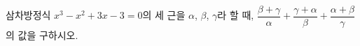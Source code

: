 삼차방정식 $x^3-x^2+3x-3=0$의 세 근을 $\alpha$, $\beta$, $\gamma$라 할 때, $\dfrac{\beta+\gamma}{\alpha}+\dfrac{\gamma+\alpha}{\beta}+\dfrac{\alpha+\beta}{\gamma}$의 값을 구하시오.
